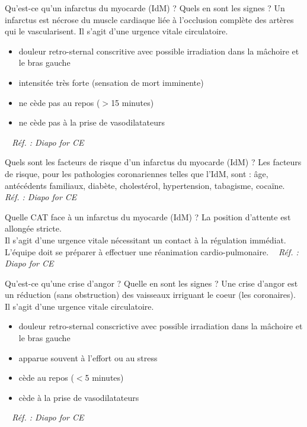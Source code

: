 \documentclass[grid,avery5371,landscape]{flashcards}
\makeatletter
\newcounter{nocarte}
\newcommand{\categ}[1]{%
  \def\@categ{#1}%
  \setcounter{nocarte}{0}%
}
\newcommand{\source}[1]{%
  \medskip
  \itshape%
   ~ \hfill Réf. : #1}
\makeatother
\begin{document}
\color[HTML]{01DF01}
\categ{CE-CP-REG}
\begin{flashcard}[bilan]{
 Qu'est-ce qu'un infarctus du myocarde (IdM) ? Quels en sont les signes ?   }
   Un infarctus est nécrose du muscle cardiaque liée à l'occlusion complète des artères qui le vascularisent.  Il s'agit d'une urgence vitale circulatoire. 
   \begin{itemize}        
\item douleur retro-sternal conscritive avec possible irradiation dans la mâchoire et le bras gauche       
\item intensitée très forte (sensation de mort imminente)        
\item ne cède pas au repos ($>$15 minutes)       
 \item ne cède pas à la prise de vasodilatateurs  
 \end{itemize}
  \source{Diapo for CE }
\end{flashcard}


\color[HTML]{01DF01}
\categ{CE-CP-REG}
\begin{flashcard}[bilan]{
 Quels sont les facteurs de risque d'un infarctus du myocarde (IdM) ?   }
  Les facteurs de risque, pour les pathologies coronariennes telles que l'IdM, sont : âge, antécédents familiaux, diabète, cholestérol, hypertension, tabagisme, cocaïne.
  \source{Diapo for CE }
\end{flashcard}


\color[HTML]{01DF01}
\categ{CE-CP-REG}
\begin{flashcard}[CAT]{
 Quelle CAT face à un infarctus du myocarde (IdM) ?   }
  La position d'attente est allongée stricte. \\    Il s'agit d'une urgence vitale nécessitant un contact à la régulation immédiat. \\   L'équipe doit se préparer à effectuer une réanimation cardio-pulmonaire.
  \source{Diapo for CE }
\end{flashcard}


\color[HTML]{01DF01}
\categ{CE-CP-REG}
\begin{flashcard}[bilan]{
 Qu'est-ce qu'une crise d'angor ? Quelle en sont les signes ?   }
  Une crise d'angor est un réduction (sans obstruction) des vaisseaux irriguant le coeur (les coronaires).  Il s'agit d'une urgence vitale circulatoire.
   \begin{itemize}
       \item douleur retro-sternal conscrictive avec possible irradiation dans la mâchoire et le bras gauche
       \item apparue souvent à l'effort ou au stress
       \item cède au repos ($<$5 minutes)
       \item cède à la prise de vasodilatateurs
   \end{itemize}
  \source{Diapo for CE }
\end{flashcard}
\end{document}
